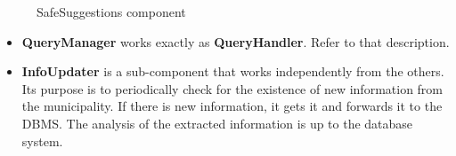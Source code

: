 \documentclass[./main.tex]{subfiles}
\begin{document}
\begin{itemize}
\begin{figure}[H]
  \caption{SafeSuggestions component}
  \end{figure}
  \begin{itemize}
  \item
    \textbf{QueryManager} works exactly as \textbf{QueryHandler}. Refer to that
    description.
  \item
    \textbf{InfoUpdater} is a sub-component that works independently from the
    others. Its purpose is to periodically check for the existence of new
    information from the municipality. If there is new information, it gets it
    and forwards it to the DBMS. The analysis of the extracted information is
    up to the database system.
  \end{itemize}
\end{itemize}
\end{document}
